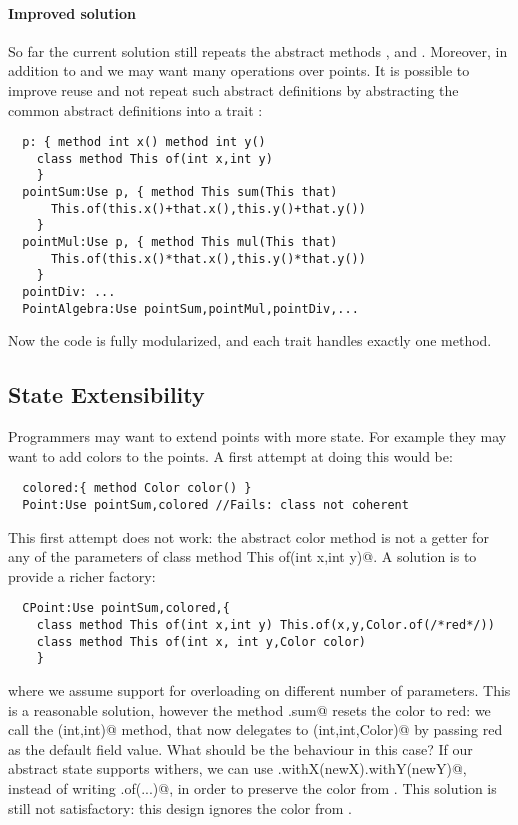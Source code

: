   \paragraph{Improved solution} So far the current solution still
  repeats the abstract methods \Q@x@, \Q@y@ and \Q@of@.
  Moreover, in addition to \Q@sum@ and \Q@mul@ we may want many
  operations over points. It is possible to improve reuse
  and not repeat such abstract definitions by abstracting the common
  abstract definitions into a trait \Q@p@: 
\saveSpace
\begin{lstlisting}
  p: { method int x() method int y()
    class method This of(int x,int y)
    }
  pointSum:Use p, { method This sum(This that)
      This.of(this.x()+that.x(),this.y()+that.y())
    }
  pointMul:Use p, { method This mul(This that)
      This.of(this.x()*that.x(),this.y()*that.y())
    }
  pointDiv: ...
  PointAlgebra:Use pointSum,pointMul,pointDiv,...
\end{lstlisting}
\saveSpace      
Now the code is fully modularized, and each trait handles exactly one method.

\subsection{State Extensibility}
Programmers may want to extend points with more state. For example 
they may want to add colors to the points. A first attempt at doing
this would be:
\saveSpace
\begin{lstlisting}
  colored:{ method Color color() }
  Point:Use pointSum,colored //Fails: class not coherent
\end{lstlisting}
\saveSpace
This first attempt does not work: the abstract color method
is not a getter for any of the parameters of 
\Q@ class method This of(int x,int y)@. 
A solution is to provide a richer factory:
\saveSpace
\begin{lstlisting}
  CPoint:Use pointSum,colored,{
    class method This of(int x,int y) This.of(x,y,Color.of(/*red*/))
    class method This of(int x, int y,Color color)
    }
\end{lstlisting}
\saveSpace
\noindent 
where we assume support for overloading on different number of parameters.
This is a reasonable solution, however the method \Q@CPoint.sum@ resets
the color to red: we call the \Q@of(int,int)@ method, that now
delegates to \Q@of(int,int,Color)@ by passing red as the default field
value.  What should be the behaviour in this case?  If our abstract
state supports withers, we can use
\Q@this.withX(newX).withY(newY)@, instead of writing \Q@This.of(...)@, in order to preserve the color from
\Q@this@.  This solution is still not satisfactory: this design ignores
the color from \Q@that@.

